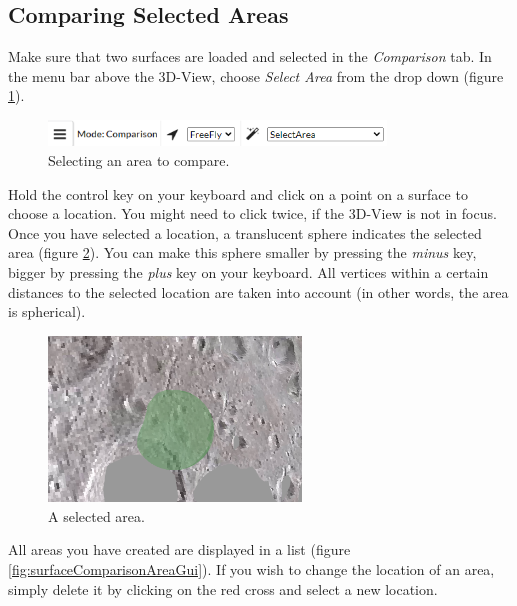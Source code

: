 \subsection{Comparing Selected Areas}

Make sure that two surfaces are loaded and selected in the \emph{Comparison} tab. In the menu bar above the 3D-View, choose \emph{Select Area} from the drop down (figure \ref{fig:surfaceComparisonAreaSelection}).

\begin{figure}[h]
	\centering
	\includegraphics[width=0.8\textwidth]{pics/surfaceComparisonSelectArea.PNG}
	\caption[Selecting an area to compare.]{Selecting an area to compare.}
	\label{fig:surfaceComparisonAreaSelection}
\end{figure}

Hold the control key on your keyboard and click on a point on a surface to choose a location. You might need to click twice, if the 3D-View is not in focus. Once you have selected a location, a translucent sphere indicates the selected area (figure \ref{fig:surfaceComparisonAreaSphere}). You can make this sphere smaller by pressing the \emph{minus} key, bigger by pressing the \emph{plus} key on your keyboard. All vertices within a certain distances to the selected location are taken into account (in other words, the area is spherical).

\begin{figure}[h]
	\centering
	\includegraphics[width=0.6\textwidth]{pics/surfaceComparisonAreaSphere.PNG}
	\caption[A selected area.]{A selected area.}
	\label{fig:surfaceComparisonAreaSphere}
\end{figure}

All areas you have created are displayed in a list (figure \ref{fig:surfaceComparisonAreaGui}). If you wish to change the location of an area, simply delete it by clicking on the red cross and select a new location. 

